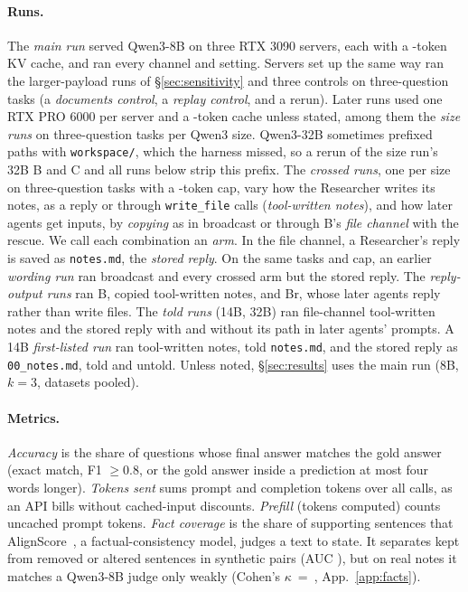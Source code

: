 \documentclass[sigplan,10pt,nonacm,review,anonymous]{acmart}
\begin{document}
\paragraph{Runs.} The \emph{main run} served Qwen3-8B on three RTX 3090 servers, each with a
\nBigKv-token KV cache, and ran every channel and setting. Servers set up the same way ran the
larger-payload runs of \S\ref{sec:sensitivity} and three controls on \nRepN three-question tasks (a
\emph{documents control}, a \emph{replay control}, and a rerun). Later runs used one RTX PRO 6000 per server
and a \nKvPro-token cache unless stated, among them the \emph{size runs} on \nPSizeEightN
three-question tasks per Qwen3 size. Qwen3-32B sometimes prefixed paths with \texttt{workspace/},
which the harness missed, so a rerun of the size run's 32B B and C and all runs below strip this prefix.
The \emph{crossed runs}, one per size on \nRTenN three-question tasks with a \nCapSplit-token cap, vary how
the Researcher writes its notes, as a reply or through \texttt{write\_file} calls (\emph{tool-written
notes}), and how later agents get inputs, by \emph{copying} as in broadcast or through B's \emph{file
channel} with the rescue. We call each combination an \emph{arm}. In the file channel, a Researcher's reply
is saved as \texttt{notes.md}, the \emph{stored reply}. On the same tasks
and cap, an earlier \emph{wording run} ran broadcast and every crossed arm but the stored reply. The
\emph{reply-output runs} ran B, copied tool-written notes, and Br, whose later agents reply rather than
write files. The \emph{told runs} (14B, 32B) ran file-channel tool-written notes and the stored reply with and without
its path in later agents' prompts. A 14B \emph{first-listed run} ran tool-written notes, told
\texttt{notes.md}, and the stored reply as \texttt{00\_notes.md}, told and untold. Unless noted, \S\ref{sec:results} uses the main run (8B, $k=3$,
datasets pooled).

\paragraph{Metrics.} \emph{Accuracy} is the share of questions whose final answer matches the gold answer
(exact match, F1 $\ge 0.8$, or the gold answer inside a prediction at most four words longer).
\emph{Tokens sent} sums prompt and completion tokens over all calls, as an API bills without
cached-input discounts. \emph{Prefill} (tokens computed) counts uncached prompt tokens. \emph{Fact
coverage} is the share of supporting sentences that AlignScore~\cite{alignscore}, a factual-consistency
model, judges a text to state. It separates kept from removed or altered sentences in \nSynN synthetic
pairs (AUC \nSynAAuc), but on real notes it matches a Qwen3-8B judge only weakly (Cohen's
$\kappa$~=~\nAsQKappa, App.~\ref{app:facts}).
\end{document}
